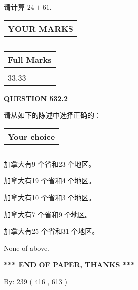 \documentclass{ctexart}
\begin{document}
  
 
请计算 $ %
24 +  %
61 $.
 

 

 
  
\vspace{0.2in}
  
\noindent\begin{tabular}{|l|}
\hline
 YOUR MARKS  \\
\hline
 \\ 
 \\ 
\hline
\end{tabular}
\hspace{0.05in} \begin{tabular}{|l|}
\hline
 Full Marks  \\
\hline
 \\ 
33.33 \\
\hline
\end{tabular}
{\textbf{\Large{QUESTION
532.2 
}}}
  
  
请从如下的陈述中选择正确的：
  
  
\noindent\hspace{3.0in} \begin{tabular}{|l|}
\hline
Your choice \\
\hline
 \\ 
 \\ 
\hline
\end{tabular}
  
  
 
 
加拿大有9 个省和23 个地区。
 
 
加拿大有19 个省和4 个地区。
 
 
加拿大有10 个省和3 个地区。
 
 
加拿大有7 个省和9 个地区。
 
 
加拿大有25 个省和31 个地区。
 
 
 None of above.
 
 
   
   
 \vspace{0.2in}
 
   
   
   
   
\vspace{1.0in} 
{\textbf{\large{ *** END OF PAPER, THANKS *** }}} 
   
   
\hspace{1.0in} By: 
 239 ( 416 ,  613 )
   
\end{document}
